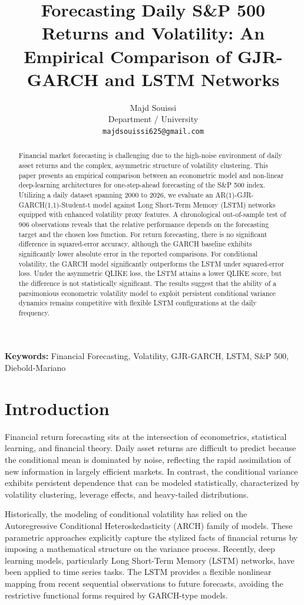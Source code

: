 \documentclass[11pt,a4paper]{article}
\title{Forecasting Daily S\&P 500 Returns and Volatility: An Empirical Comparison of GJR-GARCH and LSTM Networks}
\author{Majd Souissi \\
Department / University \\
\texttt{majdsouissi625@gmail.com}}
\date{}
\begin{document}
\maketitle

\begin{abstract}
Financial market forecasting is challenging due to the high-noise environment of daily asset returns and the complex, asymmetric structure of volatility clustering. This paper presents an empirical comparison between an econometric model and non-linear deep-learning architectures for one-step-ahead forecasting of the S\&P 500 index. Utilizing a daily dataset spanning 2000 to 2026, we evaluate an AR(1)-GJR-GARCH(1,1)-Student-t model against Long Short-Term Memory (LSTM) networks equipped with enhanced volatility proxy features. A chronological out-of-sample test of 906 observations reveals that the relative performance depends on the forecasting target and the chosen loss function. For return forecasting, there is no significant difference in squared-error accuracy, although the GARCH baseline exhibits significantly lower absolute error in the reported comparisons. For conditional volatility, the GARCH model significantly outperforms the LSTM under squared-error loss. Under the asymmetric QLIKE loss, the LSTM attains a lower QLIKE score, but the difference is not statistically significant. The results suggest that the ability of a parsimonious econometric volatility model to exploit persistent conditional variance dynamics remains competitive with flexible LSTM configurations at the daily frequency.
\end{abstract}

\textbf{Keywords:} Financial Forecasting, Volatility, GJR-GARCH, LSTM, S\&P 500, Diebold-Mariano

\section{Introduction}
Financial return forecasting sits at the intersection of econometrics, statistical learning, and financial theory. Daily asset returns are difficult to predict because the conditional mean is dominated by noise, reflecting the rapid assimilation of new information in largely efficient markets. In contrast, the conditional variance exhibits persistent dependence that can be modeled statistically, characterized by volatility clustering, leverage effects, and heavy-tailed distributions. 

Historically, the modeling of conditional volatility has relied on the Autoregressive Conditional Heteroskedasticity (ARCH) family of models. These parametric approaches explicitly capture the stylized facts of financial returns by imposing a mathematical structure on the variance process. Recently, deep learning models, particularly Long Short-Term Memory (LSTM) networks, have been applied to time series tasks. The LSTM provides a flexible nonlinear mapping from recent sequential observations to future forecasts, avoiding the restrictive functional forms required by GARCH-type models. 
\end{document}
